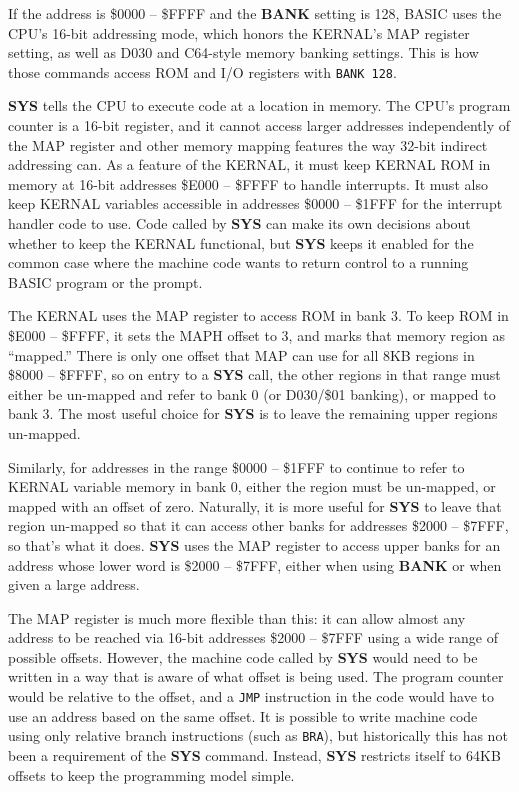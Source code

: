 If the address is \$0000 -- \$FFFF and the {\bf BANK} setting is 128, BASIC uses the CPU's 16-bit addressing mode, which honors the KERNAL's MAP register setting, as well as D030 and C64-style memory banking settings. This is how those commands access ROM and I/O registers with \texttt{BANK 128}.

{\bf SYS} tells the CPU to execute code at a location in memory. The CPU's program counter is a 16-bit register, and it cannot access larger addresses independently of the MAP register and other memory mapping features the way 32-bit indirect addressing can. As a feature of the KERNAL, it must keep KERNAL ROM in memory at 16-bit addresses \$E000 -- \$FFFF to handle interrupts. It must also keep KERNAL variables accessible in addresses \$0000 -- \$1FFF for the interrupt handler code to use. Code called by {\bf SYS} can make its own decisions about whether to keep the KERNAL functional, but {\bf SYS} keeps it enabled for the common case where the machine code wants to return control to a running BASIC program or the  prompt.

The KERNAL uses the MAP register to access ROM in bank 3. To keep ROM in \$E000 -- \$FFFF, it sets the MAPH offset to 3, and marks that memory region as ``mapped.'' There is only one offset that MAP can use for all 8KB regions in \$8000 -- \$FFFF, so on entry to a {\bf SYS} call, the other regions in that range must either be un-mapped and refer to bank 0 (or D030/\$01 banking), or mapped to bank 3. The most useful choice for {\bf SYS} is to leave the remaining upper regions un-mapped.

Similarly, for addresses in the range \$0000 -- \$1FFF to continue to refer to KERNAL variable memory in bank 0, either the region must be un-mapped, or mapped with an offset of zero. Naturally, it is more useful for {\bf SYS} to leave that region un-mapped so that it can access other banks for addresses \$2000 -- \$7FFF, so that's what it does. {\bf SYS} uses the MAP register to access upper banks for an address whose lower word is \$2000 -- \$7FFF, either when using {\bf BANK} or when given a large address.

The MAP register is much more flexible than this: it can allow almost any address to be reached via 16-bit addresses \$2000 -- \$7FFF using a wide range of possible offsets. However, the machine code called by {\bf SYS} would need to be written in a way that is aware of what offset is being used. The program counter would be relative to the offset, and a {\tt JMP} instruction in the code would have to use an address based on the same offset. It is possible to write machine code using only relative branch instructions (such as {\tt BRA}), but historically this has not been a requirement of the {\bf SYS} command. Instead, {\bf SYS} restricts itself to 64KB offsets to keep the programming model simple.
